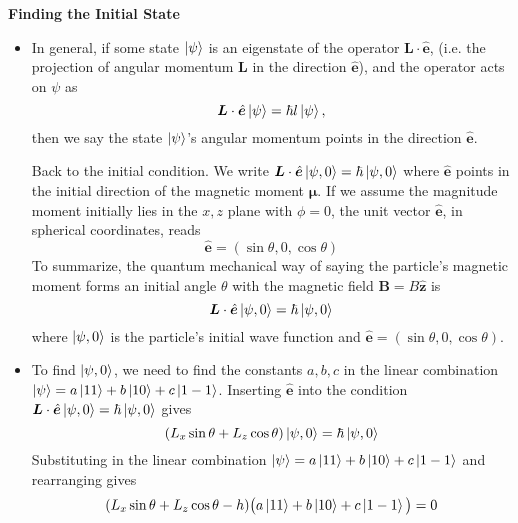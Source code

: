 \documentclass[11pt, a4paper]{article}
\renewcommand{\vec}[1]{\bm{#1}} %
\newcommand{\uvec}[1]{\hat{\vec{#1}}} %
\newcommand{\m}{\vec{\mu}}  %
\begin{document}
\textbf{Finding the Initial State}
\begin{itemize}	
	\item In general, if some state $ \ket{\psi} $ is an eigenstate of the operator $ \vec{L}\cdot \uvec{e} $, (i.e. the projection of angular momentum $ \vec{L} $ in the direction $ \uvec{e} $), and the operator acts on $ \psi $ as 
	\begin{equation*}
		\vec{L}\cdot \uvec{e} \ket{\psi} = \hbar l \ket{\psi},
	\end{equation*}
 	then we say the state $ \ket{\psi} $'s angular momentum points in the direction $ \uvec{e} $.
	
	Back to the initial condition. We write $ \vec{L}\cdot\uvec{e} \ket{\psi, 0} = \hbar \ket{\psi, 0} $ where $ \uvec{e} $ points in the initial direction of the magnetic moment $ \m $. If we assume the magnitude moment initially lies in the $ x, z $ plane with $ \phi = 0 $, the unit vector $ \uvec{e} $, in spherical coordinates, reads
	\begin{equation*}
		\uvec{e} = (\sin \theta, 0, \cos \theta)
	\end{equation*}
	To summarize, the quantum mechanical way of saying the particle's magnetic moment forms an initial angle $ \theta $ with the magnetic field $ \vec{B} = B \uvec{z} $ is
	\begin{equation*}
		\vec{L}\cdot\uvec{e} \ket{\psi, 0} = \hbar \ket{\psi, 0}
	\end{equation*}
	where $ \ket{\psi, 0} $ is the particle's initial wave function and $ \uvec{e} = (\sin \theta, 0, \cos \theta) $. 
	
	\item To find $ \ket{\psi, 0} $, we need to find the constants $ a, b, c $ in the linear combination $ \ket{\psi} = a \ket{11} + b \ket{10} + c \ket{1 -1} $. Inserting $ \uvec{e} $ into the condition $ \vec{L}\cdot\uvec{e} \ket{\psi, 0} = \hbar \ket{\psi, 0} $ gives
	\begin{equation*}
		(L_{x}\sin \theta + L_{z}\cos \theta)\ket{\psi, 0} = \hbar \ket{\psi, 0}
	\end{equation*}
	Substituting in the linear combination $ \ket{\psi} = a \ket{11} + b \ket{10} + c \ket{1 -1} $ and rearranging gives
	\begin{equation*}
		(L_{x}\sin \theta + L_{z}\cos \theta - h)\big(a \ket{11} + b\ket{10} + c\ket{1-1}\big) = 0
	\end{equation*}
	
\end{itemize}
\end{document}
